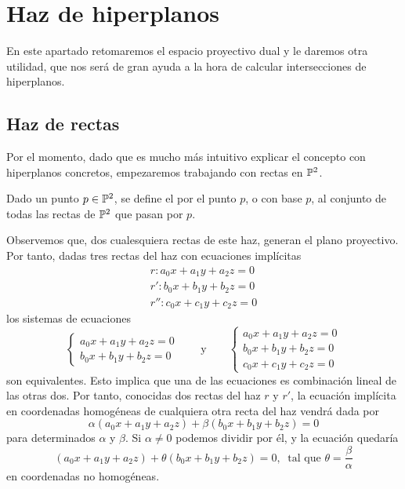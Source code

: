 \section{Haz de hiperplanos}
En este apartado retomaremos el espacio proyectivo dual y le daremos otra utilidad, que nos será de gran ayuda a la hora de calcular intersecciones de hiperplanos.

\subsection{Haz de rectas}
Por el momento, dado que es mucho más intuitivo explicar el concepto  con hiperplanos concretos, empezaremos trabajando con rectas en $\mathbb{P}^2$.
\begin{defi}
	Dado un punto $p\in\mathbb{P}^2$, se define el  por el punto $p$, o con base $p$, al conjunto de todas las rectas de $\mathbb{P}^2$ que pasan por $p$.
\end{defi}
Observemos que, dos cualesquiera rectas de este haz, generan el plano proyectivo. Por tanto, dadas tres rectas del haz con ecuaciones implícitas
\begin{equation}
	\label{C3_eq_implicitas_rectas_haz}
	\begin{split}
		r:a_0x+a_1y+a_2z=0\\
		r':b_0x+b_1y+b_2z=0\\
		r'':c_0x+c_1y+c_2z=0
	\end{split}
\end{equation}
los sistemas de ecuaciones 
\begin{equation}
	\begin{cases}
	a_0x+a_1y+a_2z=0\\
	b_0x+b_1y+b_2z=0
	\end{cases} \qquad \text{y} \qquad \begin{cases}
	a_0x+a_1y+a_2z=0\\
	b_0x+b_1y+b_2z=0\\
	c_0x+c_1y+c_2z=0
	\end{cases}
\end{equation}
son equivalentes. Esto implica que una de las ecuaciones es combinación lineal de las otras dos. Por tanto, conocidas dos rectas del haz $r$ y $r'$, la ecuación implícita en coordenadas homogéneas de cualquiera otra recta del haz vendrá dada por
\begin{equation}
	\label{C3_eq_recta_haz}
	\alpha(a_0x+a_1y+a_2z)+\beta(b_0x+b_1y+b_2z)=0
\end{equation}
para determinados $\alpha$ y $\beta$. Si $\alpha\not=0$ podemos dividir por él, y la ecuación quedaría
\begin{equation}
	\label{C3_eq_recta_haz_nohom}
	(a_0x+a_1y+a_2z)+\theta(b_0x+b_1y+b_2z)=0, \ \text{ tal que } \theta=\frac{\beta}{\alpha}
\end{equation}
en coordenadas no homogéneas. 

